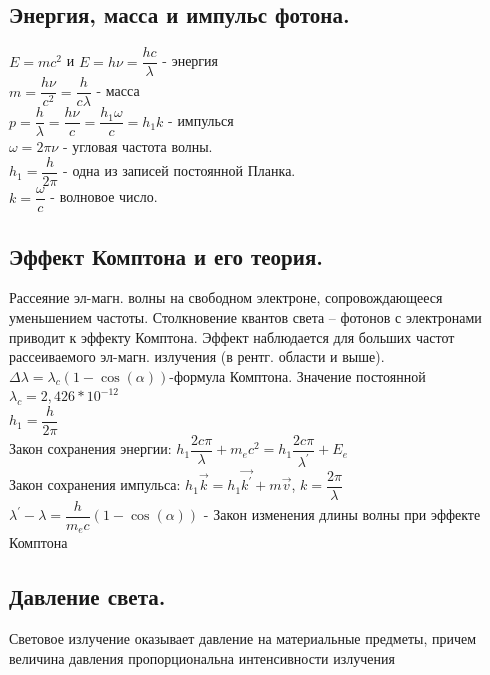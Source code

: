 \documentclass[12pt]{report}
\begin{document}
\subsection{Энергия, масса и импульс фотона.}

$E=mc^2$ и $E=h\nu=\dfrac{hc}{\lambda}$ - энергия\\

$m=\dfrac{h\nu}{c^2}=\dfrac{h}{c\lambda}$ - масса\\

$p=\dfrac{h}{\lambda}=\dfrac{h\nu}{c}=\dfrac{h_1\omega}{c}=h_1k$ - импулься\\

$\omega=2\pi\nu$ - угловая частота волны.\\

$h_1 = \dfrac{h}{2\pi}$ - одна из записей постоянной Планка.\\

$k=\dfrac{\omega}{c}$ - волновое число.
\subsection{ Эффект Комптона и его теория.}
Рассеяние эл-магн. волны на свободном электроне, сопровождающееся
уменьшением частоты. Столкновение квантов света – фотонов с
электронами приводит к эффекту Комптона. Эффект наблюдается для больших частот рассеиваемого эл-магн. излучения (в рентг. области и выше).\\

$\Delta\lambda = \lambda_c(1-\cos(\alpha))$-формула Комптона.
Значение постоянной $\lambda_c = 2,426*10^{−12}$ \\

$h_1=\dfrac{h}{2\pi}$\\
Закон сохранения энергии:
$h_1\dfrac{2c\pi}{\lambda}+m_ec^2=h_1\dfrac{2c\pi}{\lambda^{'}}+E_e$\\
Закон сохранения импульса:
$h_1\overrightarrow{k}=h_1\overrightarrow{k^{'}} + m\overrightarrow{v}$, $k=\dfrac{2\pi}{\lambda}$\\

$\lambda^{'}-\lambda = \dfrac{h}{m_ec} (1-\cos(\alpha))$ - Закон изменения длины волны при эффекте
Комптона
\subsection{ Давление света.}
Световое излучение оказывает давление на
материальные предметы, причем величина давления
пропорциональна интенсивности излучения\\
\end{document}
